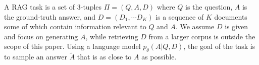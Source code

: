 A RAG task
is a set of 3-tuples $\Pi=(Q,A,D)$ where
$Q$ is the question, $A$ is the ground-truth answer, and $D=(D_1,\cdots D_K)$ is
a sequence of $K$ documents
some of which contain information relevant to $Q$ and $A$.
We assume $D$ is given and focus on generating $A$,
while retrieving $D$ from a larger corpus is outside the scope of this paper.
Using a language model $p_\theta(A|Q,D)$,
the goal of the task is to sample an answer $\tilde{A}$ that is as close to $A$ as possible.

